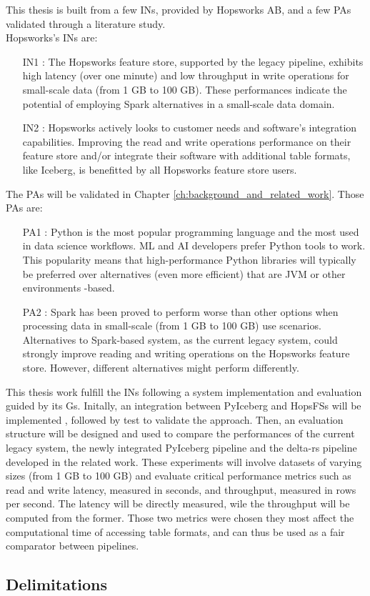 This thesis is built from a few \glspl{IN}, provided by Hopsworks \gls{AB}, and a few \glspl{PA} validated through a literature study. \\ Hopsworks's \glspl{IN} are:
\begin{itemize}
    \item[IN1 :] The Hopsworks feature store, supported by the legacy pipeline, exhibits high latency (over one minute) and low throughput in write operations for small-scale data (from 1 GB to 100 GB). These performances indicate the potential of employing Spark alternatives in a small-scale data domain.
    \item[IN2 :] Hopsworks actively looks to customer needs and software's integration capabilities. Improving the read and write operations performance on their feature store and/or integrate their software with additional table formats, like Iceberg, is benefitted by all Hopsworks feature store users.
\end{itemize}
The \glspl{PA} will be validated in Chapter \ref{ch:background_and_related_work}. Those \glspl{PA} are: 
\begin{itemize}
    \item[PA1 :] Python is the most popular programming language and the most used in data science workflows. \gls{ML} and \gls{AI} developers prefer Python tools to work. This popularity means that high-performance Python libraries will typically be preferred over alternatives (even more efficient) that are \gls{JVM} or other environments -based.
    \item[PA2 :] Spark has been proved to perform worse than other options when processing data in small-scale (from 1 GB to 100 GB) use scenarios. Alternatives to Spark-based system, as the current legacy system, could strongly improve reading and writing operations on the Hopsworks feature store. However, different alternatives might perform differently.
\end{itemize}

This thesis work fulfill the \glspl{IN} following a system implementation and evaluation guided by its \glspl{G}. Initally, an integration between PyIceberg and \glspl{HopsFS} will be implemented \cite{niaziHopsFSScalingHierarchical2017}, followed by test to validate the approach. Then, an evaluation structure will be designed and used to compare the performances of the current legacy system, the newly integrated PyIceberg pipeline and the delta-rs pipeline developed in the related work. These experiments will involve datasets of varying sizes (from 1 GB to 100 GB) and evaluate critical performance metrics such as read and write latency, measured in seconds, and throughput, measured in rows per second. The latency will be directly measured, wile the throughput will be computed from the former. Those two metrics were chosen they most affect the computational time of accessing table formats, and can thus be used as a fair comparator between pipelines.


\subsection{Delimitations}
    \label{subsec:delimitations}
    
